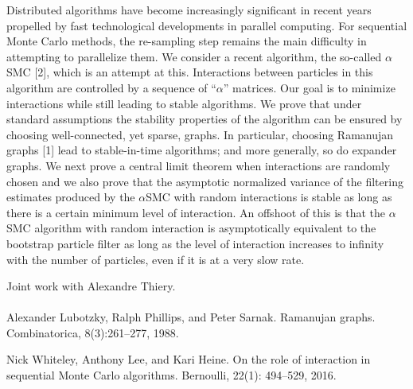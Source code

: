 Distributed algorithms have become increasingly significant in recent
years propelled by fast technological developments in parallel
computing. For sequential Monte Carlo methods, the re-sampling
step remains the main difficulty in attempting to parallelize them. We
consider a recent algorithm, the so-called $\alpha$SMC [2], which is an
attempt at this. Interactions between particles in this algorithm are
controlled by a sequence of “$\alpha$” matrices. Our goal is to minimize
interactions while still leading to stable algorithms. We prove that
under standard assumptions the stability properties of the algorithm
can be ensured by choosing well-connected, yet sparse, graphs. In
particular, choosing Ramanujan graphs [1] lead to stable-in-time
algorithms; and more generally, so do expander graphs. We next
prove a central limit theorem when interactions are randomly chosen
and we also prove that the asymptotic normalized variance of the
filtering estimates produced by the $\alpha$SMC with random interactions is
stable as long as there is a certain minimum level of interaction. An
offshoot of this is that the $\alpha$SMC algorithm with random interaction is
asymptotically equivalent to the bootstrap particle filter as long as the level of interaction increases to infinity with the
number of particles, even if it is at a very slow rate.

Joint work with Alexandre Thiery.
\\
\\
\noindent [1] Alexander Lubotzky, Ralph Phillips, and Peter Sarnak. Ramanujan
graphs. Combinatorica, 8(3):261–277, 1988.

\noindent [2] Nick Whiteley, Anthony Lee, and Kari Heine. On the role of
interaction in sequential Monte Carlo algorithms. Bernoulli, 22(1):
494–529, 2016.